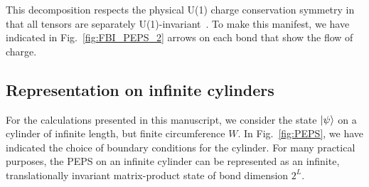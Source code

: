 This decomposition respects the physical U(1) charge conservation
symmetry in that all tensors are separately
U(1)-invariant~\cite{bauer2011}. To make this manifest, we have
indicated in Fig.~\ref{fig:FBI_PEPS_2} arrows on each bond that show
the flow of charge.

\subsection{Representation on infinite cylinders}
For the calculations presented in this manuscript, we consider the
state $\vert \psi \rangle$ on a cylinder of infinite length, but finite
circumference $W$. In Fig.~\ref{fig:PEPS}, we have indicated the
choice of boundary conditions for the cylinder. For many practical
purposes, the PEPS on an infinite cylinder can be represented as an
infinite, translationally invariant matrix-product state of bond
dimension $2^L$.

